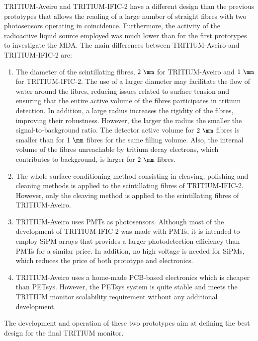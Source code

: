TRITIUM-Aveiro and TRITIUM-IFIC-2 have a different design than the previous prototypes that allows the reading of a large number of straight fibres with two photosensors operating in coincidence. Furthermore, the activity of the radioactive liquid source employed was much lower than for the first prototypes to investigate the MDA. The main differences between TRITIUM-Aveiro and TRITIUM-IFIC-2 are:

\begin{enumerate}

\item{} The diameter of the scintillating fibres, $2~\mm$ for TRITIUM-Aveiro and $1~\mm$ for TRITIUM-IFIC-2. The use of a larger diameter may facilitate the flow of water around the fibres, reducing issues related to surface tension and ensuring that the entire active volume of the fibres participates in tritium detection. In addition, a large radius increases the rigidity of the fibres, improving their robustness. However, the larger the radius the smaller the signal-to-background ratio. The detector active volume for $2~\mm$ fibres is smaller than for $1~\mm$ fibres for the same filling volume. Also, the internal volume of the fibres unreachable by tritium decay electrons, which contributes to background, is larger for $2~\mm$ fibres.


\item{} The whole surface-conditioning method consisting in cleaving, polishing and cleaning methods is applied to the scintillating fibres of TRITIUM-IFIC-2. However, only the cleaving method is applied to the scintillating fibres of TRITIUM-Aveiro.

\item{} TRITIUM-Aveiro uses PMTs as photosensors. Although most of the development of TRITIUM-IFIC-2 was made with PMTs, it is intended to employ SiPM arrays that provides a larger photodetection efficiency than PMTs for a similar price. In addition, no high voltage is needed for SiPMs, which reduces the price of both prototype and electronics.

\item{} TRITIUM-Aveiro uses a home-made PCB-based electronics which is cheaper than PETsys. However, the PETsys system is quite stable and meets the TRITIUM monitor scalability requirement without any additional development.

\end{enumerate}

The development and operation of these two prototypes aim at defining the best design for the final TRITIUM monitor.

